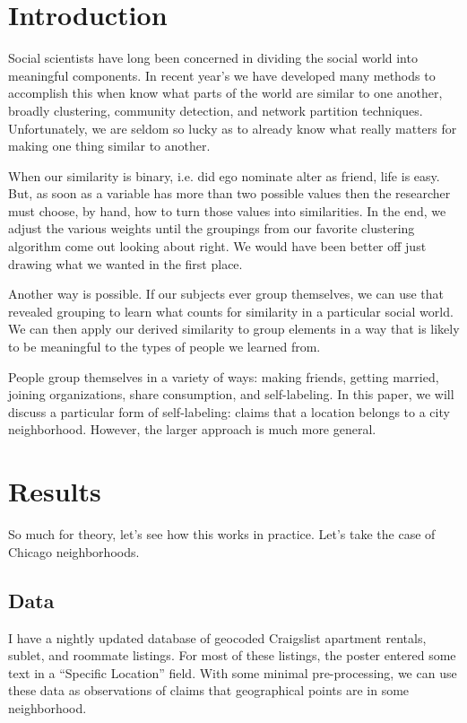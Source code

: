 \documentclass[12pt,letter]{article}\usepackage[]{graphicx}\usepackage[]{color}
\begin{document}
\section*{Introduction}
Social scientists have long been concerned in dividing the social
world into meaningful components. In recent year's we have
developed many methods to accomplish this when know what parts of the
world are similar to one another, broadly clustering, community
detection, and network partition techniques. Unfortunately, we are
seldom so lucky as to already know what really matters for making one
thing similar to another. 

When our similarity is binary, i.e. did ego nominate alter as friend,
life is easy. But, as soon as a variable has more than two possible
values then the researcher must choose, by hand, how to turn those
values into similarities. In the end, we adjust the various weights
until the groupings from our favorite clustering algorithm come out
looking about right. We would have been better off just drawing what
we wanted in the first place.

Another way is possible. If our subjects ever group themselves, we can
use that revealed grouping to learn what counts for similarity in a particular
social world. We can then apply our derived similarity to group elements in
a way that is likely to be meaningful to the types of people we learned from.

People group themselves in a variety of ways: making friends, getting
married, joining organizations, share consumption, and
self-labeling. In this paper, we will discuss a particular form of
self-labeling: claims that a location belongs to a city
neighborhood. However, the larger approach is much more general.



\section*{Results}
So much for theory, let's see how this works in practice. Let's take
the case of Chicago neighborhoods.  

\subsection*{Data}




I have a nightly updated database of geocoded Craigslist apartment
rentals, sublet, and roommate listings. For most of these listings,
the poster entered some text in a ``Specific Location'' field. With
some minimal pre-processing, we can use these data as observations of
claims that geographical points are in some neighborhood.
\end{document}
